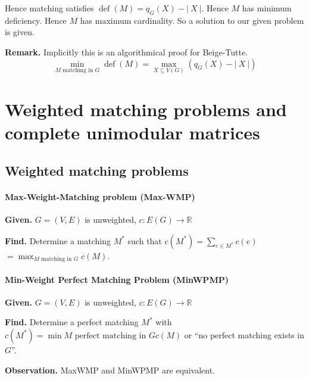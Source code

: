 \documentclass[a4paper]{article}
\theoremstyle{definition}
\newcommand{\card}[1]{\left|\:\!#1\:\!\right|}
\newcommand{\given}[1]{\textbf{Given.} #1\par}
\newcommand{\find}[1]{\textbf{Find.} #1\par}
\DeclareMathOperator{\deficiency}{def}
\begin{document}
Hence matching satisfies $\deficiency(M) = q_G(X) - \card{X}$.
Hence $M$ has minimum deficiency. Hence $M$ has maximum cardinality. So a solution to our given problem is given.

\textbf{Remark.}
  Implicitly this is an algorithmical proof for Beige-Tutte.
  \[
    \min_{M \text{ matching in } G} \deficiency(M) = \max_{X \subseteq V(G)} (q_G(X) - \card{X})
  \]

\section{Weighted matching problems and complete unimodular matrices}
\subsection{Weighted matching problems}
%
\paragraph{Max-Weight-Matching problem (Max-WMP)}
%
\given{$G = (V, E)$ is unweighted, $c: E(G) \rightarrow \mathbb{R}$}
\find{Determine a matching $M^*$ such that
  $c(M^*) = \sum_{e \in M^*} c(e)$
  $= \max_{M \text{ matching in } G} c(M)$.
}

\paragraph{Min-Weight Perfect Matching Problem (MinWPMP)}
%
\given{$G = (V, E)$ is unweighted, $c: E(G) \rightarrow \mathbb{R}$}
\find{Determine a perfect matching $M^*$ with
  $c(M^*) = \min{M \text{ perfect matching in } G} c(M)$
  or ``no perfect matching exists in $G$''.
}

\textbf{Observation.} MaxWMP and MinWPMP are equivalent.
\end{document}
